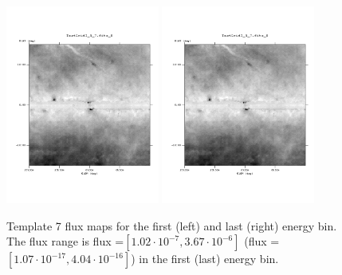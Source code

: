 \documentclass{article}
\begin{document}
\begin{figure}
\centering
\includegraphics[trim = 50 100 70 100, clip = true, width=0.45\textwidth]{figs/Template_maps/Template7_Ebin01}
\includegraphics[trim = 50 100 70 100, clip = true, width=0.45\textwidth]{figs/Template_maps/Template7_Ebin71}
\caption{Template 7 flux maps for the first (left) and last (right) energy bin. The flux range is flux =$[1.02 \cdot 10^{-7}, 3.67 \cdot 10^{-6}]$ (flux = $[1.07 \cdot 10^{-17}, 4.04 \cdot 10^{-16}]$) in the first (last) energy bin.}
\end{figure}
\end{document}
